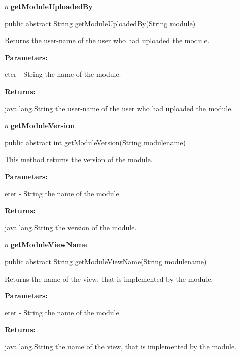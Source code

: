 o {\bf getModuleUploadedBy} 

\begin{PRE}
 public abstract String getModuleUploadedBy(String module)
\end{PRE}

\begin{description}
\htmlDD Returns the user-name of the user who had uploaded the module. 

\begin{description}
\item {\bf Parameters:}  

eter - String the name of the module.  
\item {\bf Returns:}  

java.lang.String the user-name of the user who had uploaded the module.  
\end{description}

\end{description}

o {\bf getModuleVersion} 

\begin{PRE}
 public abstract int getModuleVersion(String modulename)
\end{PRE}

\begin{description}
\htmlDD This method returns the version of the module. 

\begin{description}
\item {\bf Parameters:}  

eter - String the name of the module.  
\item {\bf Returns:}  

java.lang.String the version of the module.  
\end{description}

\end{description}

o {\bf getModuleViewName} 

\begin{PRE}
 public abstract String getModuleViewName(String modulename)
\end{PRE}

\begin{description}
\htmlDD Returns the name of the view, that is implemented by the module. 

\begin{description}
\item {\bf Parameters:}  

eter - String the name of the module.  
\item {\bf Returns:}  

java.lang.String the name of the view, that is implemented by the module.  
\end{description}

\end{description}

